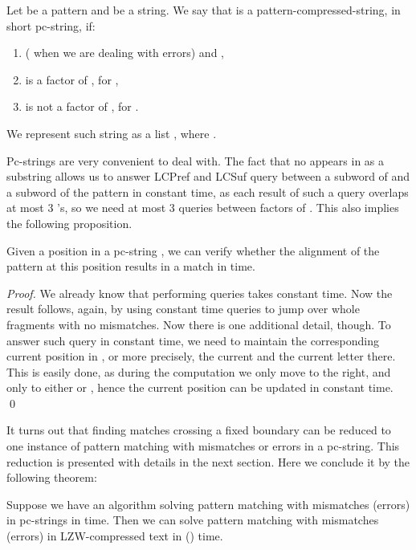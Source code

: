 \documentclass[runningheads]{llncs}
\begin{document}
\begin{definition}
Let  be a pattern and  be a string. We say that  is a pattern-compressed-string, in short pc-string, if: 
\begin{enumerate}
\item  ( when we are dealing with errors) and ,
\item  is a factor of , for ,
\item  is not a factor of , for .
\end{enumerate}
We represent such string as a list , where .
\end{definition}

Pc-strings are very convenient to deal with. The fact that no  appears in  as a substring allows us to answer LCPref and LCSuf query between a subword of  and a subword of the pattern in constant time, as each result of such a query overlaps at most 3 's, so we need at most 3 queries between factors of . This also implies the
following proposition.



\begin{proposition}\label{proposition:verify_match_mismatches}
Given a position in a pc-string , we can verify whether the alignment of the pattern at this position results in a match in  time.
\end{proposition}
\begin{proof}
We already know that performing  queries takes constant time. Now the result follows, again, by using constant time  queries to jump over whole fragments with no mismatches. Now there is one additional detail, though. To answer such query in constant time, we need to maintain the corresponding current position in , or more precisely, the current  and the current letter there. This is easily done, as during the computation we only move to the right, and only to either  or , hence the current position can be updated in constant time.
\qed
\end{proof}




It turns out that finding matches crossing a fixed boundary can be reduced to one instance of pattern matching with mismatches or errors in a pc-string. This reduction is presented with details in the next section. Here we conclude it by the following theorem:

\begin{theorem}\label{theorem:reduce_to_PCstrings}
Suppose we have an algorithm solving pattern matching with  mismatches (errors) in pc-strings in  time. Then we can solve pattern matching with  mismatches (errors) in LZW-compressed text in  () time.
\end{theorem}
\end{document}
